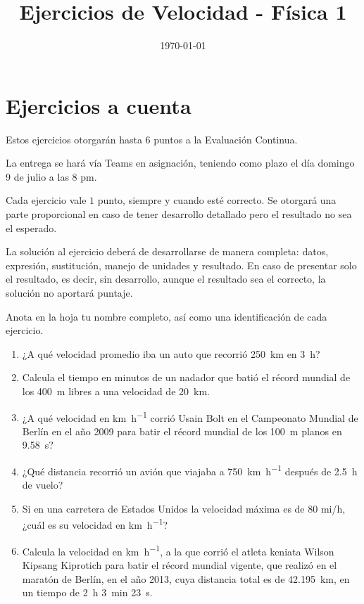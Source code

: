 \documentclass[14pt]{extarticle}
\title{\vspace*{-2cm} Ejercicios de Velocidad - Física 1\vspace{-5ex}}
\date{\today}
\begin{document}
\maketitle

\section{Ejercicios a cuenta}

Estos ejercicios otorgarán hasta $6$ puntos a la Evaluación Continua.

La entrega se hará vía Teams en asignación, teniendo como plazo el día domingo 9 de julio a las 8 pm.

Cada ejercicio vale $1$ punto, siempre y cuando esté correcto. Se otorgará una parte proporcional en caso de tener desarrollo detallado pero el resultado no sea el esperado.

La solución al ejercicio deberá de desarrollarse de manera completa: datos, expresión, sustitución, manejo de unidades y resultado. En caso de presentar solo el resultado, es decir, sin desarrollo, aunque el resultado sea el correcto, la solución no aportará puntaje.

Anota en la hoja tu nombre completo, así como una identificación de cada ejercicio.

\begin{enumerate}
\item ¿A qué velocidad promedio iba un auto que recorrió \SI{250}{\kilo\meter} en \SI{3}{\hour}?
\item Calcula el tiempo en minutos de un nadador que batió el récord mundial de los \SI{400}{\meter} libres a una velocidad de \SI{20}{\kilo\meter}.
\item ¿A qué velocidad en \unit{\kilo\meter\per\hour} corrió Usain Bolt en el Campeonato Mundial de Berlín en el año 2009 para batir el récord mundial de los \SI{100}{\meter} planos en \SI{9.58}{\second}?
\item ¿Qué distancia recorrió un avión que viajaba a \SI{750}{\kilo\meter\per\hour} después de \SI{2.5}{\hour} de vuelo?
\item Si en una carretera de Estados Unidos la velocidad máxima es de $80$ mi/\unit{\hour}, ¿cuál es su velocidad en \unit{\kilo\meter\per\hour}?
\item Calcula la velocidad en \unit{\kilo\meter\per\hour}, a la que corrió el atleta keniata Wilson Kipsang Kiprotich para batir el récord mundial vigente, que realizó en el maratón de Berlín, en el año 2013, cuya distancia total es de \SI{42.195}{\kilo\meter}, en un tiempo de \SI{2}{\hour} \SI{3}{\minute} \SI{23}{\second}.
\end{enumerate}
\end{document}
